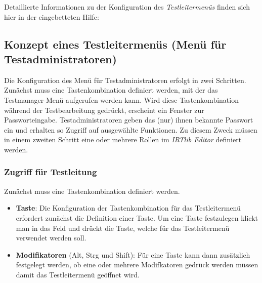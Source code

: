 \documentclass[
  letterpaper,
  DIV=11]{scrreprt}
\begin{document}
Detaillierte Informationen zu der Konfiguration des
\emph{Testleitermenüs} finden sich hier in der eingebetteten Hilfe:

\begin{tcolorbox}[enhanced jigsaw, colbacktitle=quarto-callout-tip-color!10!white, coltitle=black, colframe=quarto-callout-tip-color-frame, leftrule=.75mm, breakable, opacitybacktitle=0.6, toprule=.15mm, title=\textcolor{quarto-callout-tip-color}{\faLightbulb}\hspace{0.5em}{Eingebettete Programmhilfe}, colback=white, titlerule=0mm, arc=.35mm, bottomtitle=1mm, toptitle=1mm, rightrule=.15mm, bottomrule=.15mm, left=2mm, opacityback=0]

\hypertarget{konzept-eines-testleitermenuxfcs-menuxfc-fuxfcr-testadministratoren-1}{%
\subsection{Konzept eines Testleitermenüs (Menü für
Testadministratoren)}\label{konzept-eines-testleitermenuxfcs-menuxfc-fuxfcr-testadministratoren-1}}

Die Konfiguration des Menü für Testadministratoren erfolgt in zwei
Schritten. Zunächst muss eine Tastenkombination definiert werden, mit
der das Testmanager-Menü aufgerufen werden kann. Wird diese
Tastenkombination während der Testbearbeitung gedrückt, erscheint ein
Fenster zur Passworteingabe. Testadministratoren geben das (nur) ihnen
bekannte Passwort ein und erhalten so Zugriff auf ausgewählte
Funktionen. Zu diesem Zweck müssen in einem zweiten Schritt eine oder
mehrere Rollen im \emph{IRTlib Editor} definiert werden.

\hypertarget{zugriff-fuxfcr-testleitung-1}{%
\subsubsection{Zugriff für
Testleitung}\label{zugriff-fuxfcr-testleitung-1}}

Zunächst muss eine Tastenkombination definiert werden.

\begin{itemize}
\item
  \textbf{Taste}: Die Konfiguration der Tastenkombination für das
  Testleitermenü erfordert zunächst die Definition einer Taste. Um eine
  Taste festzulegen klickt man in das Feld und drückt die Taste, welche
  für das Testleitermenü verwendet werden soll.
\item
  \textbf{Modifikatoren} (Alt, Strg und Shift): Für eine Taste kann dann
  zusätzlich festgelegt werden, ob eine oder mehrere Modifkatoren
  gedrück werden müssen damit das Testleitermenü geöffnet wird.
\end{itemize}


\end{tcolorbox}
\end{document}

